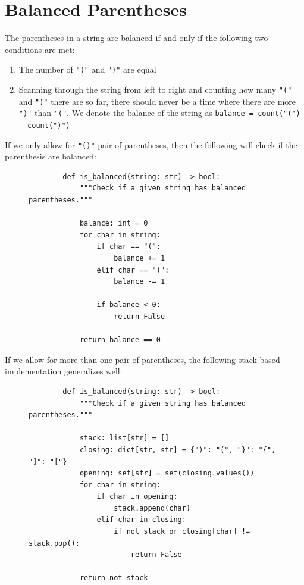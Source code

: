\documentclass[11pt]{article}
\begin{document}
\section{Balanced Parentheses}

The parentheses in a string are balanced if and only if the following two
conditions are met:

\begin{enumerate}
    \item The number of \texttt{"("} and \texttt{")"}
          are equal
    \item Scanning through the string from left to right and counting how many
          \texttt{"("} and \texttt{")"} there are so
          far, there should never be a time where there are more
          \texttt{")"} than \texttt{"("}. We denote the
          balance of the string as
          \texttt{balance = count("(") - count(")")}
\end{enumerate}

If we only allow for \texttt{"()"} pair of parentheses, then the
following will check if the parenthesis are balanced:

\begin{figure}[H]
    \centering
    \begin{verbatim}
        def is_balanced(string: str) -> bool:
            """Check if a given string has balanced parentheses."""

            balance: int = 0
            for char in string:
                if char == "(":
                    balance += 1
                elif char == ")":
                    balance -= 1

                if balance < 0:
                    return False

            return balance == 0
    \end{verbatim}
\end{figure}

If we allow for more than one pair of parentheses, the following stack-based
implementation generalizes well:

\begin{figure}[H]
    \centering
    \begin{verbatim}
        def is_balanced(string: str) -> bool:
            """Check if a given string has balanced parentheses."""

            stack: list[str] = []
            closing: dict[str, str] = {")": "(", "}": "{", "]": "["}
            opening: set[str] = set(closing.values())
            for char in string:
                if char in opening:
                    stack.append(char)
                elif char in closing:
                    if not stack or closing[char] != stack.pop():
                        return False

            return not stack
    \end{verbatim}
\end{figure}

\end{document}
